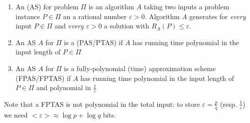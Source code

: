 \begin{lec}[2011-01-26]\end{lec}

\begin{defn}
\begin{enumerate}
  \item An (AS) for problem $\Pi$ is an algorithm $A$ taking two inputs a problem instance $P \in \Pi$ an a rational number $\varepsilon > 0$. Algorithm $A$ generates for \emph{every} input $P \in \Pi$ and \emph{every} $\varepsilon > 0$ a solution with $R_A(P) \leq \varepsilon$.
  \item An AS $A$ for $\Pi$ is a (PAS/PTAS) if $A$ has running time polynomial in the input length of $P \in \Pi$
  \item An AS $A$ for $\Pi$ is a fully-polynomial (time) approximation scheme (FPAS/FPTAS) if $A$ has running time polynomial in the input length of $P \in \Pi$ and polynomial in $\frac 1 \varepsilon$
\end{enumerate}
\end{defn}

Note that a FPTAS is not polynomial in the total input: to store $\varepsilon=\frac pq$ (resp. $\frac 1 \varepsilon$) we need $<\varepsilon>\approx \log p + \log q$ bits.

